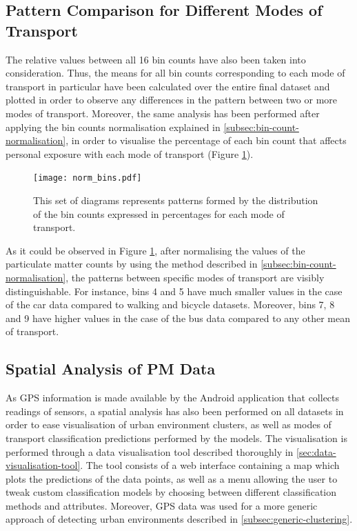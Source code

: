 \documentclass[bsc,frontabs,twoside,singlespacing,parskip,deptreport]{infthesis}     %
\begin{document}
\subsection{Pattern Comparison for Different Modes of Transport}

The relative values between all 16 bin counts have also been taken into consideration. Thus, the means for all bin counts corresponding to each mode of transport in particular have been calculated over the entire final dataset and plotted in order to observe any differences in the pattern between two or more modes of transport. Moreover, the same analysis has been performed after applying the bin counts normalisation explained in \ref{subsec:bin-count-normalisation}, in order to visualise the percentage of each bin count that affects personal exposure with each mode of transport (Figure \ref{fig:norm-bins}).

\begin{figure}[h!]
  \center
  \texttt{[image: norm\_bins.pdf]} 
  \caption{This set of diagrams represents patterns formed by the distribution of the bin counts expressed in percentages for each mode of transport.}
  \label{fig:norm-bins}
\end{figure}

As it could be observed in Figure \ref{fig:norm-bins}, after normalising the values of the particulate matter counts by using the method described in \ref{subsec:bin-count-normalisation}, the patterns between specific modes of transport are visibly distinguishable. For instance, bins 4 and 5 have much smaller values in the case of the car data compared to walking and bicycle datasets. Moreover, bins 7, 8 and 9 have higher values in the case of the bus data compared to any other mean of transport.

\subsection{Spatial Analysis of PM Data}

As GPS information is made available by the Android application that collects readings of sensors, a spatial analysis has also been performed on all datasets in order to ease visualisation of urban environment clusters, as well as modes of transport classification predictions performed by the models. The visualisation is performed through a data visualisation tool described thoroughly in \ref{sec:data-visualisation-tool}. The tool consists of a web interface containing a map which plots the predictions of the data points, as well as a menu allowing the user to tweak custom classification models by choosing between different classification methods and attributes. Moreover, GPS data was used for a more generic approach of detecting urban environments described in \ref{subsec:generic-clustering}.
\end{document}
